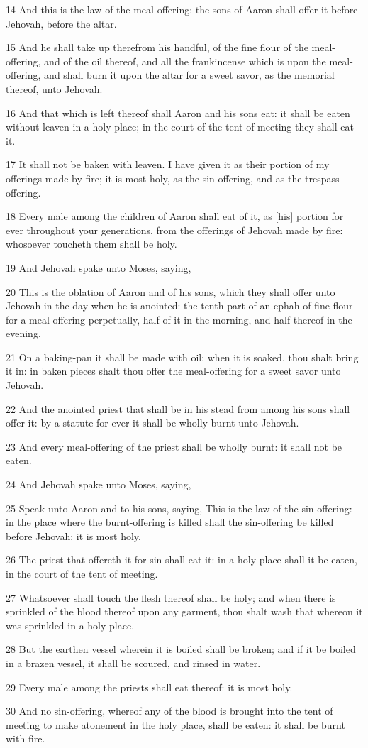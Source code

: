 \par 14 And this is the law of the meal-offering: the sons of Aaron shall offer it before Jehovah, before the altar.
\par 15 And he shall take up therefrom his handful, of the fine flour of the meal-offering, and of the oil thereof, and all the frankincense which is upon the meal-offering, and shall burn it upon the altar for a sweet savor, as the memorial thereof, unto Jehovah.
\par 16 And that which is left thereof shall Aaron and his sons eat: it shall be eaten without leaven in a holy place; in the court of the tent of meeting they shall eat it.
\par 17 It shall not be baken with leaven. I have given it as their portion of my offerings made by fire; it is most holy, as the sin-offering, and as the trespass-offering.
\par 18 Every male among the children of Aaron shall eat of it, as [his] portion for ever throughout your generations, from the offerings of Jehovah made by fire: whosoever toucheth them shall be holy.
\par 19 And Jehovah spake unto Moses, saying,
\par 20 This is the oblation of Aaron and of his sons, which they shall offer unto Jehovah in the day when he is anointed: the tenth part of an ephah of fine flour for a meal-offering perpetually, half of it in the morning, and half thereof in the evening.
\par 21 On a baking-pan it shall be made with oil; when it is soaked, thou shalt bring it in: in baken pieces shalt thou offer the meal-offering for a sweet savor unto Jehovah.
\par 22 And the anointed priest that shall be in his stead from among his sons shall offer it: by a statute for ever it shall be wholly burnt unto Jehovah.
\par 23 And every meal-offering of the priest shall be wholly burnt: it shall not be eaten.
\par 24 And Jehovah spake unto Moses, saying,
\par 25 Speak unto Aaron and to his sons, saying, This is the law of the sin-offering: in the place where the burnt-offering is killed shall the sin-offering be killed before Jehovah: it is most holy.
\par 26 The priest that offereth it for sin shall eat it: in a holy place shall it be eaten, in the court of the tent of meeting.
\par 27 Whatsoever shall touch the flesh thereof shall be holy; and when there is sprinkled of the blood thereof upon any garment, thou shalt wash that whereon it was sprinkled in a holy place.
\par 28 But the earthen vessel wherein it is boiled shall be broken; and if it be boiled in a brazen vessel, it shall be scoured, and rinsed in water.
\par 29 Every male among the priests shall eat thereof: it is most holy.
\par 30 And no sin-offering, whereof any of the blood is brought into the tent of meeting to make atonement in the holy place, shall be eaten: it shall be burnt with fire.

